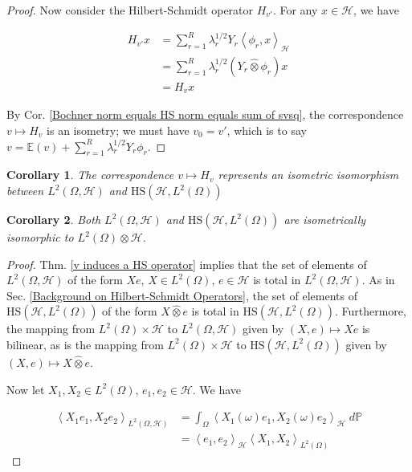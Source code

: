 \documentclass{article}
\numberwithin{theorem}{section}
\numberwithin{lemma}{section}
\numberwithin{definition}{section}
\numberwithin{assumption}{section}
\numberwithin{proposition}{section}
\numberwithin{remark}{section}
\newtheorem{corollary}{Corollary}
\numberwithin{corollary}{section}
\numberwithin{conjecture}{section}
\numberwithin{example}{section}
\newcommand{\E}{\mathbb{E}}
\newcommand{\aset}[1]{\left \langle #1 \right \rangle}
\newcommand{\D}{\displaystyle}
\newcommand{\intp}[1] {\D \int_\Omega {#1 } \; d \mathbb P}
\newcommand{\CH}{\mathcal H}
\begin{document}
\begin{multicols*}{2}
\begin{proof}
    Now consider the Hilbert-Schmidt operator $H_{v'}$. For any $x \in \mathcal H$, we have 

    \begin{align*}
        H_{v'}x &= \sum_{r=1}^R \lambda_r^{1/2} Y_r \aset{ \phi_r,x }_\mathcal H
        \\&=
        \sum_{r=1}^R \lambda_r^{1/2} (Y_r \widehat \otimes \phi_r)x 
        \\&= H_vx 
    \end{align*}

    By Cor. \ref{Bochner norm equals HS norm equals sum of svsq}, the correspondence $v \mapsto H_v$ is an isometry; we must have $v_0 = v'$, which is to say $v = \E(v) + \sum_{r=1}^R \lambda_r^{1/2} Y_r \phi_r$.  
\end{proof}

\begin{corollary} \label{surjectivity}
     The correspondence $v \mapsto H_v$ represents an isometric isomorphism between $L^2(\Omega, \mathcal H)$ and $\mathrm{HS}(\mathcal H, L^2(\Omega))$
\end{corollary}

\begin{corollary}
    Both $L^2(\Omega, \mathcal H)$ and $\mathrm{HS}(\mathcal H, L^2(\Omega))$ are isometrically isomorphic to $L^2(\Omega) \otimes \mathcal H$. 
\end{corollary}

\begin{proof}
    Thm. \ref{v induces a HS operator} implies that the set of elements of $L^2(\Omega, \mathcal H)$ of the form $Xe$, $X \in L^2(\Omega)$, $e \in \mathcal H$ is total in $L^2(\Omega, \mathcal H)$. As in Sec. \ref{Background on Hilbert-Schmidt Operators}, the set of elements of $\text{HS}(\mathcal H, L^2(\Omega))$ of the form $X \widehat \otimes e$ is total in $\text{HS}(\mathcal H, L^2(\Omega))$. Furthermore, the mapping from $L^2(\Omega) \times \mathcal H$ to $L^2(\Omega, \mathcal H)$ given by $(X,e) \mapsto Xe$ is bilinear, as is the mapping from $L^2(\Omega) \times \mathcal H$ to $\text{HS}(\mathcal H, L^2(\Omega))$ given by $(X,e) \mapsto X \widehat \otimes e$. 
    
    Now let $X_1, X_2 \in L^2(\Omega)$, $e_1, e_2 \in \CH$. We have 

    \begin{align*}
        \aset{X_1e_1, X_2e_2}_{L^2(\Omega, \CH)} &= 
        \intp{\aset{X_1(\omega)e_1, X_2(\omega) e_2}_\CH }
        \\&= 
        \aset{e_1, e_2}_\CH \aset{X_1, X_2}_{L^2(\Omega)}
    \end{align*}


\end{proof}
\end{multicols*}
\end{document}
